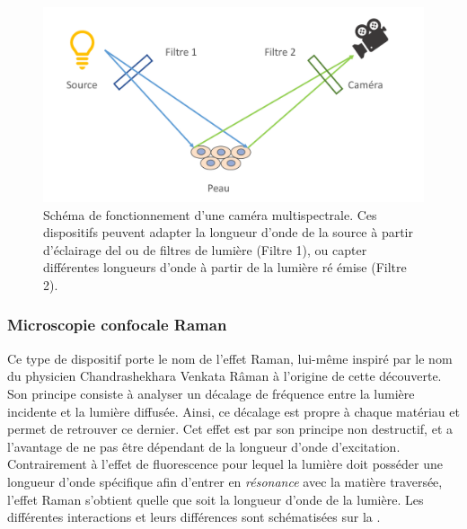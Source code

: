 \begin{figure}[H]
    \centering
    \includegraphics[width=\linewidth]{contents/chapter_2/resources/scheme_multispectral_principle.pdf}
    \caption{Schéma de fonctionnement d'une caméra multispectrale. Ces dispositifs peuvent adapter la longueur d'onde de la source à partir d'éclairage \gls{del} ou de filtres de lumière (Filtre 1), ou capter différentes longueurs d'onde à partir de la lumière ré émise (Filtre 2).}
    \label{fig:scheme_multispectral_principle}
\end{figure}\par

\subsubsection{Microscopie confocale Raman}
Ce type de dispositif porte le nom de l'effet Raman, lui-même inspiré par le nom du physicien Chandrashekhara Venkata Râman à l'origine de cette découverte. Son principe consiste à analyser un décalage de fréquence entre la lumière incidente et la lumière diffusée. Ainsi, ce décalage est propre à chaque matériau et permet de retrouver ce dernier. Cet effet est par son principe non destructif, et a l'avantage de ne pas être dépendant de la longueur d'onde d'excitation. Contrairement à l'effet de fluorescence pour lequel la lumière doit posséder une longueur d'onde spécifique afin d'entrer en \textit{résonance} avec la matière traversée, l'effet Raman s'obtient quelle que soit la longueur d'onde de la lumière. Les différentes interactions et leurs différences sont schématisées sur la .\par

